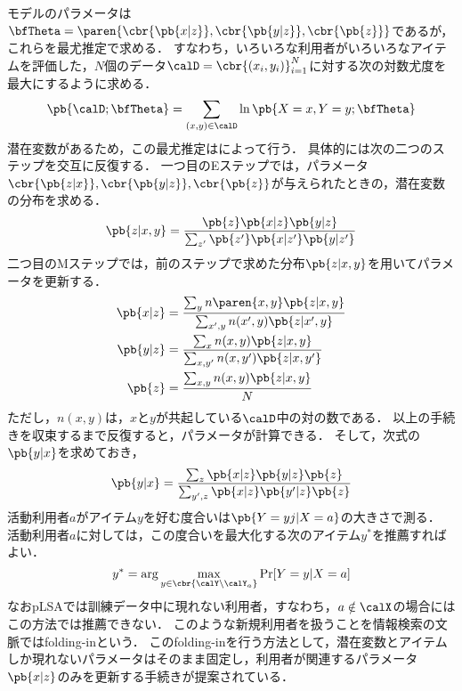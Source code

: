 モデルのパラメータは$\bfTheta = \paren{\cbr{\pb{x|z}}, \cbr{\pb{y|z}},\cbr{\pb{z}}}$であるが，これらを最尤推定で求める．
すなわち，いろいろな利用者がいろいろなアイテムを評価した，$N$個のデータ$\calD=\cbr{(x_i,y_i)}_{i=1}^N$に対する次の対数尤度を最大にするように求める．
\[
\pb{\calD; \bfTheta} = \sum_{(x,y)\in \calD} \ln\pb{X=x, Y=y; \bfTheta}
\]
潜在変数があるため，この最尤推定は\cite{jrss:77:01,jpublist:077x}によって行う．
具体的には次の二つのステップを交互に反復する．
一つ目のEステップでは，パラメータ$\cbr{\pb{z|x}},\cbr{\pb{y|z}},\cbr{\pb{z}}$が与えられたときの，潜在変数
の分布を求める．
\begin{equation}
\pb{z|x,y}=\frac{\pb{z}\pb{x|z}\pb{y|z}}{\sum_{z'}\pb{z'}\pb{x|z'}\pb{y|z'}}
\label{eq:estep}
\end{equation}
二つ目のMステップでは，前のステップで求めた分布$\pb{z|x,y}$を用いてパラメータを更新する．
\begin{align}
\pb{x|z} & = \frac{\sum_y n\paren{x,y} \pb{z|x,y}}{\sum_{x',y}n(x',y)\pb{z|x',y}}\label{eq:mstepx}\\
\pb{y|z} & = \frac{\sum_x n(x,y) \pb{z|x,y}}{\sum_{x,y'} n(x,y') \pb{z|x,y'}}\label{eq:mstepy}\\
\pb{z} &=\frac{\sum_{x,y}n(x,y)\pb{z|x,y}}{N}\label{eq:mstepz}
\end{align}
ただし，$n(x,y)$は，$x$と$y$が共起している$\calD$中の対の数である．
以上の手続きを収束するまで反復すると，パラメータが計算できる．
そして，次式の$\pb{y|x}$を求めておき，
\begin{equation}
\pb{y|x} = \frac{\sum_z\pb{x|z} \pb{y|z} \pb{z}}{\sum_{y',z}\pb{x|z} \pb{y'|z} \pb{z}}
\end{equation}
活動利用者$a$がアイテム$y$を好む度合いは$\pb{Y=yj|X=a}$の大きさで測る．
活動利用者$a$に対しては，この度合いを最大化する次のアイテム$y^\ast$を推薦すればよい．
\begin{equation}
y^\ast=\arg\max_{y\in\cbr{\calY\backslash\calY_{a}}}\Pr[Y=y|X=a]
\end{equation}
なおpLSAでは訓練データ中に現れない利用者，すなわち，$a\notin\calX$の場合にはこの方法では推薦できない．
このような新規利用者を扱うことを情報検索の文脈ではfolding-inという．
このfolding-inを行う方法として，潜在変数とアイテムしか現れないパラメータはそのまま固定し，利用者が関連するパラメータ$\pb{x|z}$のみを更新する手続きが提案されている\cite{misc:089}．

